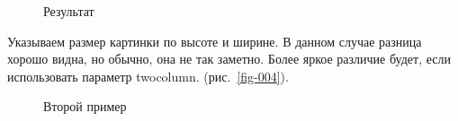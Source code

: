 \documentclass[
  english,
  russian,
  12pt,
  a4paper,
  DIV=11,
  numbers=noendperiod]{scrreprt}
\begin{document}
\begin{figure}


\caption{\label{fig-002}Результат}

\end{figure}%

Указываем размер картинки по высоте и ширине. В данном случае разница
хорошо видна, но обычно, она не так заметно. Более яркое различие будет,
если использовать параметр twocolumn. (рис.~\ref{fig-004}).

\begin{figure}


\caption{\label{fig-003}Второй пример}

\end{figure}%
\end{document}
